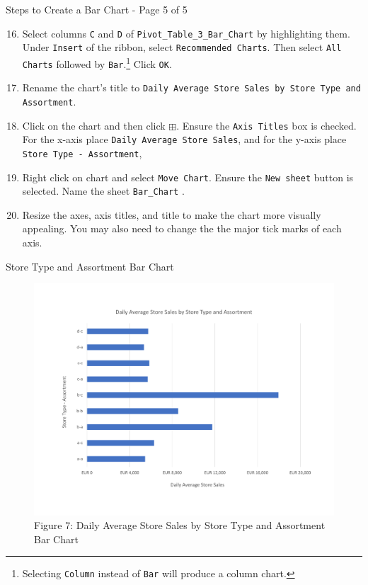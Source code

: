 \documentclass[pdf]{beamer}
\theoremstyle{remark}
\theoremstyle{definition}
\begin{document}
\begin{frame}[t]{Steps to Create a Bar Chart - Page 5 of 5}
 \small 
\begin{enumerate}
  \setcounter{enumi}{15}
\item  Select columns \texttt{C} and \texttt{D} of  \texttt{Pivot\_Table\_3\_Bar\_Chart} by highlighting them.  Under  \texttt{Insert} of the ribbon, select  \texttt{Recommended Charts}.  Then select \texttt{All Charts} followed by  \texttt{Bar}.\footnote{Selecting \texttt{Column} instead of \texttt{Bar} will produce a column chart.}     Click  \texttt{OK}.
\item Rename the chart's title to  \texttt{Daily Average Store Sales by Store Type and Assortment}. 
\item Click on the chart and then click \texttt{$\boxplus$}. Ensure the \texttt{Axis Titles} box is checked.  For the x-axis place \texttt{Daily Average Store Sales},  and for the y-axis place \texttt{Store Type - Assortment}, 
\item Right click on chart and select \texttt{Move Chart}.  Ensure the \texttt{New sheet} button is selected. Name the sheet \texttt{Bar\_Chart} .
\item  Resize the axes, axis titles, and title to make the chart more visually appealing.  You may also need to change the the major tick marks of each axis.
\end{enumerate}
\end{frame}

\begin{frame}[t]{Store Type and Assortment Bar Chart}
\begin{figure}[htbp]
    \centering
    \captionsetup{justification=centering}
    \includegraphics[clip, trim=0cm 2.3cm 0cm 2.3cm, width=1.0\textwidth]{Bar_Chart_Unit_3.pdf}  
    \caption{Figure {\color{franklinblue} 7}: Daily Average Store Sales by Store Type and Assortment Bar Chart}
    \label{fig:barchart}
\end{figure}
\end{frame}
\end{document}

